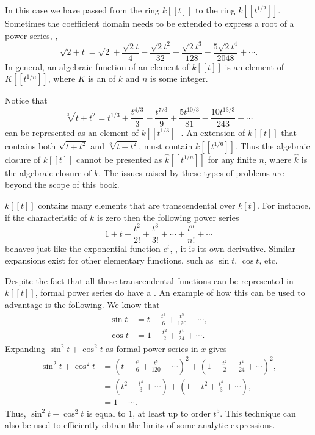 In this case we have passed from the ring $k[[t]]$ to the ring
$k[[t^{1/2}]]$.  Sometimes the coefficient domain needs to be extended
to express a root of a power series, \eg,
\[
\sqrt{2 + t} = \sqrt{2} + \frac{\sqrt{2} t}{4} - \frac{\sqrt{2} t^2}{32}
 + \frac{\sqrt{2} t^3}{128} - \frac{5 \sqrt{2} t^4}{2048} + \cdots.
\]
In general, an algebraic function of an element of $k[[t]]$ is an
element of $K[[t^{1/n}]]$, where $K$ is an 
of $k$ and $n$ is some integer.

Notice that
\[
\sqrt[3]{t+t^2}
= t^{1/3} + \frac{t^{4/3}}{3} - \frac{t^{7/3}}{9} + \frac{5
t^{10/3}}{81}
 - \frac{10 t^{13/3}}{243} + \cdots
\]
can be represented as an element of $k[[t^{1/3}]]$.  An extension of
$k[[t]]$ that contains both $\sqrt{t+t^2}$ and $\sqrt[3]{t+t^2}$, must
contain $k[[t^{1/6}]]$.  Thus the algebraic closure of $k[[t]]$ cannot
be presented as $\hat{k}[[t^{1/n}]]$ for any finite $n$, where
$\hat{k}$ is the algebraic closure of $k$.
The issues raised by these types of problems are beyond the scope of
this book.

\smallskip
$k[[t]]$ contains many elements that are transcendental over $k[t]$.
For instance, if the characteristic of $k$ is zero then the following power series
\[
1 + t + \frac{t^2}{2!} + \frac{t^3}{3!} + \cdots + \frac{t^n}{n!} +
\cdots
\]
behaves just like the exponential function $e^t$, \eg, it is its own
derivative. Similar expansions exist for other elementary functions,
such as $\sin t$, $\cos t$, etc.

Despite the fact that all these transcendental functions can be
represented in $k[[t]]$, formal power series do have a .  An example of how this can be used to advantage is the
following.  We know that
\[
\begin {aligned}
\sin t & = t - \frac{t^3}{6} + \frac{t^5}{120} - \cdots, \\
\cos t & = 1 - \frac{t^2}{2} + \frac{t^4}{24} + \cdots.
\end{aligned}
\]
Expanding $\sin^2 t + \cos^2 t$ as formal power series in $x$ gives
\[
\begin{aligned}
\sin^2 t + \cos^2 t & = 
   \left(t - \frac{t^3}{6} + \frac{t^5}{120} - \cdots\right)^2
  + 
   \left(1 - \frac{t^2}{2} + \frac{t^4}{24} + \cdots\right)^2, \\
& = \left(t^2 - \frac{t^4}{3} + \cdots\right) +
  \left(1 - t^2 + \frac{t^4}{3} + \cdots\right),\\
& = 1 + \cdots.
\end{aligned}
\]
Thus, $\sin^2 t + \cos^2 t$ is equal to $1$, at least up to order
$t^5$.  This technique can also be used to efficiently obtain the limits
of some analytic expressions.

